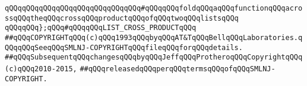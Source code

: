 \verb|qQQqqQQqqQQqqQQqqQQqqQQqqQQqqQQq#qQQqqQQqfoldqQQqaqQQqfunctionqQQqacrossqQQqtheqQQqcrossqQQqproductqQQqofqQQqtwoqQQqlistsqQQq|\newline
\newline
\verb|qQQqqQQq};qQQq#qQQqqQQqLIST_CROSS_PRODUCTqQQq|\newline
\newline
\newline
\verb|##qQQqCOPYRIGHTqQQq(c)qQQq1993qQQqbyqQQqAT&TqQQqBellqQQqLaboratories.qQQqqQQqSeeqQQqSMLNJ-COPYRIGHTqQQqfileqQQqforqQQqdetails.|\newline
\verb|##qQQqSubsequentqQQqchangesqQQqbyqQQqJeffqQQqProtheroqQQqCopyrightqQQq(c)qQQq2010-2015,|\newline
\verb|##qQQqreleasedqQQqperqQQqtermsqQQqofqQQqSMLNJ-COPYRIGHT.|\newline

